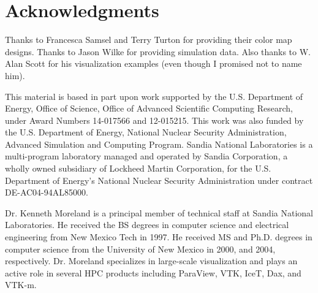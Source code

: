 \documentclass[letterpaper,twocolumn,fleqn]{article}
\begin{document}
\section{Acknowledgments}

\noindent
Thanks to Francesca Samsel and Terry Turton for providing their color map
designs. Thanks to Jason Wilke for providing simulation data. Also thanks
to W. Alan Scott for his visualization examples (even though I promised not
to name him).

This material is based in part upon work supported by the U.S. Department
of Energy, Office of Science, Office of Advanced Scientific Computing
Research, under Award Numbers 14-017566 and 12-015215. This work was also
funded by the U.S. Department of Energy, National Nuclear Security
Administration, Advanced Simulation and Computing Program. Sandia National
Laboratories is a multi-program laboratory managed and operated by Sandia
Corporation, a wholly owned subsidiary of Lockheed Martin Corporation, for
the U.S. Department of Energy's National Nuclear Security Administration
under contract DE-AC04-94AL85000.


\small



\begin{biography}
\noindent
Dr. Kenneth Moreland is a principal member of technical staff at Sandia
National Laboratories. He received the BS degrees in computer science and
electrical engineering from New Mexico Tech in 1997. He received MS and
Ph.D. degrees in computer science from the University of New Mexico in
2000, and 2004, respectively. Dr. Moreland specializes in large-scale
visualization and plays an active role in several HPC products including
ParaView, VTK, IceT, Dax, and VTK-m.
\end{biography}
\end{document}
